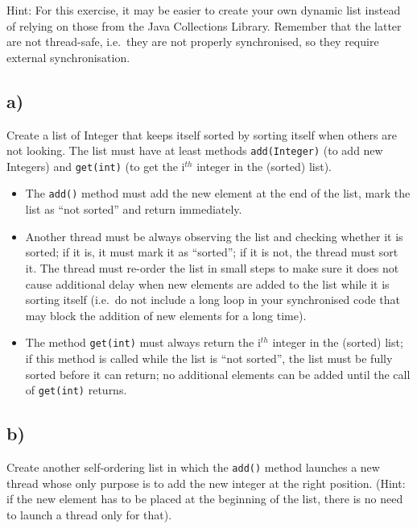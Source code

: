 \documentclass{article}
\begin{document}
Hint: For this exercise, it may be easier to create your own dynamic
list instead of relying on those from the Java Collections
Library. Remember that the latter are not thread-safe, i.e.~they are
not properly synchronised, so they require external synchronisation. 

\subsection{a)}

Create a list of Integer that keeps itself sorted by sorting itself
when others are not looking. The list must have at least methods
\verb+add(Integer)+ (to add new Integers) and \verb+get(int)+ (to get
the i$^{th}$ integer in the (sorted) list). 

\begin{itemize}
\item The \verb+add()+ method must add the new element at the end
  of the list, mark the list as ``not sorted'' and return immediately.
\item Another thread must be always observing the list and checking whether
  it is sorted; if it is, it must mark it as ``sorted''; if it is
  not, the thread must sort it. The thread must re-order 
  the list in small steps
  to make sure it does not cause additional delay when new elements
  are added to the list while it is sorting itself (i.e.~do not
  include a long loop in your synchronised code that may block the
  addition of new elements for a long time).
\item The method \verb+get(int)+ must always return the i$^{th}$
  integer in the (sorted) list; if this method is called while the
  list is ``not sorted'', the list must be fully sorted before it can
  return; no additional elements can be added until the call of
  \verb+get(int)+ returns.
\end{itemize}

\subsection{b)}
\label{sec:b}

Create another self-ordering list in which the \verb+add()+ method
launches a new thread whose only purpose is to add the new integer at
the right position. (Hint: if the new element has to be placed at the
beginning of the list, there is no need to launch a thread only for
that). 

\end{document}
